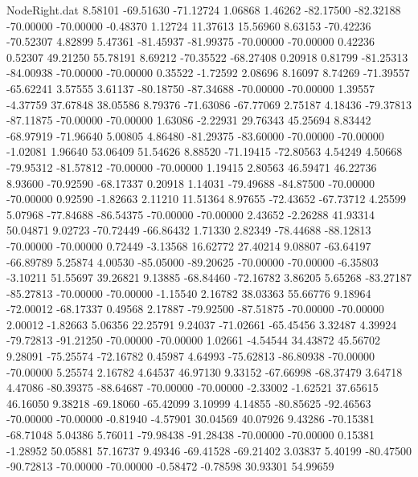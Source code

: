 \begin{filecontents}{NodeRight.dat}
   8.58101  -69.51630  -71.12724     1.06868    1.46262  -82.17500  -82.32188  -70.00000  -70.00000   -0.48370    1.12724   11.37613   15.56960
   8.63153  -70.42236  -70.52307     4.82899    5.47361  -81.45937  -81.99375  -70.00000  -70.00000    0.42236    0.52307   49.21250   55.78191
   8.69212  -70.35522  -68.27408     0.20918    0.81799  -81.25313  -84.00938  -70.00000  -70.00000    0.35522   -1.72592    2.08696    8.16097
   8.74269  -71.39557  -65.62241     3.57555    3.61137  -80.18750  -87.34688  -70.00000  -70.00000    1.39557   -4.37759   37.67848   38.05586
   8.79376  -71.63086  -67.77069     2.75187    4.18436  -79.37813  -87.11875  -70.00000  -70.00000    1.63086   -2.22931   29.76343   45.25694
   8.83442  -68.97919  -71.96640     5.00805    4.86480  -81.29375  -83.60000  -70.00000  -70.00000   -1.02081    1.96640   53.06409   51.54626
   8.88520  -71.19415  -72.80563     4.54249    4.50668  -79.95312  -81.57812  -70.00000  -70.00000    1.19415    2.80563   46.59471   46.22736
   8.93600  -70.92590  -68.17337     0.20918    1.14031  -79.49688  -84.87500  -70.00000  -70.00000    0.92590   -1.82663    2.11210   11.51364
   8.97655  -72.43652  -67.73712     4.25599    5.07968  -77.84688  -86.54375  -70.00000  -70.00000    2.43652   -2.26288   41.93314   50.04871
   9.02723  -70.72449  -66.86432     1.71330    2.82349  -78.44688  -88.12813  -70.00000  -70.00000    0.72449   -3.13568   16.62772   27.40214
   9.08807  -63.64197  -66.89789     5.25874    4.00530  -85.05000  -89.20625  -70.00000  -70.00000   -6.35803   -3.10211   51.55697   39.26821
   9.13885  -68.84460  -72.16782     3.86205    5.65268  -83.27187  -85.27813  -70.00000  -70.00000   -1.15540    2.16782   38.03363   55.66776
   9.18964  -72.00012  -68.17337     0.49568    2.17887  -79.92500  -87.51875  -70.00000  -70.00000    2.00012   -1.82663    5.06356   22.25791
   9.24037  -71.02661  -65.45456     3.32487    4.39924  -79.72813  -91.21250  -70.00000  -70.00000    1.02661   -4.54544   34.43872   45.56702
   9.28091  -75.25574  -72.16782     0.45987    4.64993  -75.62813  -86.80938  -70.00000  -70.00000    5.25574    2.16782    4.64537   46.97130
   9.33152  -67.66998  -68.37479     3.64718    4.47086  -80.39375  -88.64687  -70.00000  -70.00000   -2.33002   -1.62521   37.65615   46.16050
   9.38218  -69.18060  -65.42099     3.10999    4.14855  -80.85625  -92.46563  -70.00000  -70.00000   -0.81940   -4.57901   30.04569   40.07926
   9.43286  -70.15381  -68.71048     5.04386    5.76011  -79.98438  -91.28438  -70.00000  -70.00000    0.15381   -1.28952   50.05881   57.16737
   9.49346  -69.41528  -69.21402     3.03837    5.40199  -80.47500  -90.72813  -70.00000  -70.00000   -0.58472   -0.78598   30.93301   54.99659

\end{filecontents}
